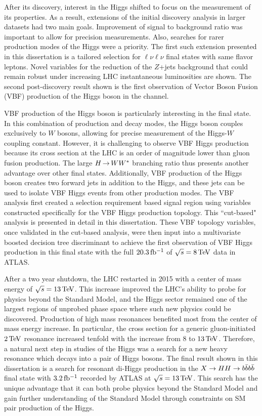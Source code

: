 After its discovery, interest in the Higgs shifted to focus on the measurement of its properties. As a result, extensions of the initial discovery analysis in larger datasets had two main goals. Improvement of signal to background ratio was important to allow for precision measurements. Also, searches for rarer production modes of the Higgs were a priority. The first such extension presented in this dissertation is a tailored selection for $\ell\nu\ell\nu$ final states with same flavor leptons. Novel variables for the reduction of the $Z$+jets background that could remain robust under increasing LHC instantaneous luminosities are shown. The second post-discovery result shown is the first observation of Vector Boson Fusion (VBF) production of the Higgs boson in the \HWWfull channel. 

VBF production of the Higgs boson is particularly interesting in the \HWWfull final state. In this combination of production and decay modes, the Higgs boson couples exclusively to $W$ bosons, allowing for precise measurement of the Higgs-$W$ coupling constant. However, it is challenging to observe VBF Higgs production because its cross section at the LHC is an order of magnitude lower than gluon fusion production. The large $H{\,{\rightarrow}\,}WW^\ast$ branching ratio thus presents another advantage over other final states. Additionally, VBF production of the Higgs boson creates two forward jets in addition to the Higgs, and these jets can be used to isolate VBF Higgs events from other production modes. The VBF \HWWfull analysis first created a selection requirement based signal region using variables constructed specifically for the VBF Higgs production topology. This ``cut-based" analysis is presented in detail in this dissertation. These VBF topology variables, once validated in the cut-based analysis, were then input into a multivariate boosted decision tree discriminant to achieve the first observation of VBF Higgs production in this final state with the full $20.3 \mbox{\,fb$^{-1}$}$ of $\sqrt{s} = 8 \TeV$ data in ATLAS. 

After a two year shutdown, the LHC restarted in 2015 with a center of mass energy of $\sqrt{s} = 13 \TeV$. This increase improved the LHC's ability to probe for physics beyond the Standard Model, and the Higgs sector remained one of the largest regions of unprobed phase space where such new physics could be discovered. Production of high mass resonances benefited most from the center of mass energy increase. In particular, the cross section for a generic gluon-initiated $2 \TeV$ resonance increased tenfold with the increase from $8$ to $13 \TeV$. Therefore, a natural next step in studies of the Higgs was a search for a new heavy resonance which decays into a pair of Higgs bosons. The final result shown in this dissertation is a search for resonant di-Higgs production in the $X\to HH \to b\bar{b}b\bar{b}$ final state with $3.2 \mbox{\,fb$^{-1}$}$ recorded by ATLAS at $\sqrt{s} = 13 \TeV$. This search has the unique advantage that it can both probe physics beyond the Standard Model and gain further understanding of the Standard Model through constraints on SM pair production of the Higgs. 

